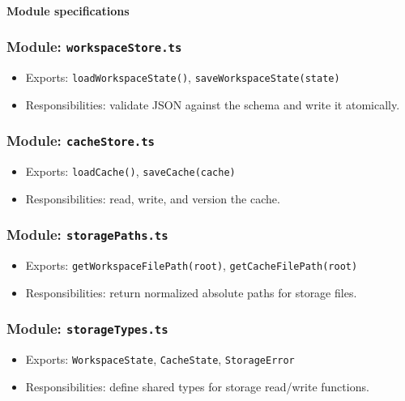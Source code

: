 \documentclass[11pt]{article}
\begin{document}
\paragraph{Module specifications}
\subsubsection*{Module: \texttt{workspaceStore.ts}}
\begin{itemize}[noitemsep]
  \item Exports: \texttt{loadWorkspaceState()}, \texttt{saveWorkspaceState(state)}
  \item Responsibilities: validate JSON against the schema and write it atomically.
\end{itemize}

\subsubsection*{Module: \texttt{cacheStore.ts}}
\begin{itemize}[noitemsep]
  \item Exports: \texttt{loadCache()}, \texttt{saveCache(cache)}
  \item Responsibilities: read, write, and version the cache.
\end{itemize}

\subsubsection*{Module: \texttt{storagePaths.ts}}
\begin{itemize}[noitemsep]
  \item Exports: \texttt{getWorkspaceFilePath(root)}, \texttt{getCacheFilePath(root)}
  \item Responsibilities: return normalized absolute paths for storage files.
\end{itemize}

\subsubsection*{Module: \texttt{storageTypes.ts}}
\begin{itemize}[noitemsep]
  \item Exports: \texttt{WorkspaceState}, \texttt{CacheState}, \texttt{StorageError}
  \item Responsibilities: define shared types for storage read/write functions.
\end{itemize}
\end{document}
